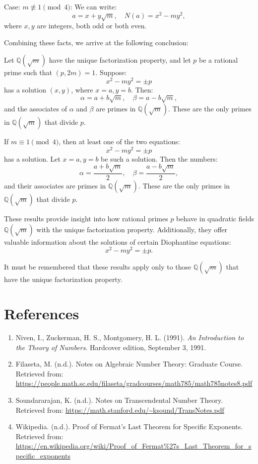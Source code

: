\documentclass{article}
\begin{document}
Case: \( m \not\equiv 1 \pmod{4} \):
We can write:
\[
a = x + y\sqrt{m}, \quad N(a) = x^2 - my^2,
\]
where \( x, y \) are integers, both odd or both even. 

Combining these facts, we arrive at the following conclusion:




Let \( \mathbb{Q}(\sqrt{m}) \) have the unique factorization property, and let \( p \) be a rational prime such that \( (p, 2m) = 1 \). Suppose:
\[
x^2 - my^2 = \pm p
\]
has a solution \( (x, y) \), where \( x = a, y = b \). Then:
\[
\alpha = a + b\sqrt{m}, \quad \beta = a - b\sqrt{m},
\]
and the associates of \( \alpha \) and \( \beta \) are primes in \( \mathbb{Q}(\sqrt{m}) \). These are the only primes in \( \mathbb{Q}(\sqrt{m}) \) that divide \( p \).



If \( m \equiv 1 \pmod{4} \), then at least one of the two equations:
\[
x^2 - my^2 = \pm p
\]
has a solution. Let \( x = a, y = b \) be such a solution. Then the numbers:
\[
\alpha = \frac{a + b\sqrt{m}}{2}, \quad \beta = \frac{a - b\sqrt{m}}{2},
\]
and their associates are primes in \( \mathbb{Q}(\sqrt{m}) \). These are the only primes in \( \mathbb{Q}(\sqrt{m}) \) that divide \( p \).

These results provide insight into how rational primes \( p \) behave in quadratic fields \( \mathbb{Q}(\sqrt{m}) \) with the unique factorization property. Additionally, they offer valuable information about the solutions of certain Diophantine equations:
\[
x^2 - my^2 = \pm p.
\]

It must be remembered that these results apply only to those \( \mathbb{Q}(\sqrt{m}) \) that have the unique factorization property.



\section{References}
\begin{enumerate}
    \item Niven, I., Zuckerman, H. S.,  Montgomery, H. L. (1991). \textit{An Introduction to the Theory of Numbers}. Hardcover edition, September 3, 1991.

    \item Filaseta, M. (n.d.). Notes on Algebraic Number Theory: Graduate Course. Retrieved from: 
    \url{https://people.math.sc.edu/filaseta/gradcourses/math785/math785notes8.pdf}

    \item Soundararajan, K. (n.d.). Notes on Transcendental Number Theory. Retrieved from: 
    \url{https://math.stanford.edu/~ksound/TransNotes.pdf}

    \item Wikipedia. (n.d.). Proof of Fermat's Last Theorem for Specific Exponents. Retrieved from: 
    \url{https://en.wikipedia.org/wiki/Proof_of_Fermat%27s_Last_Theorem_for_specific_exponents}
\end{enumerate}
\end{document}
